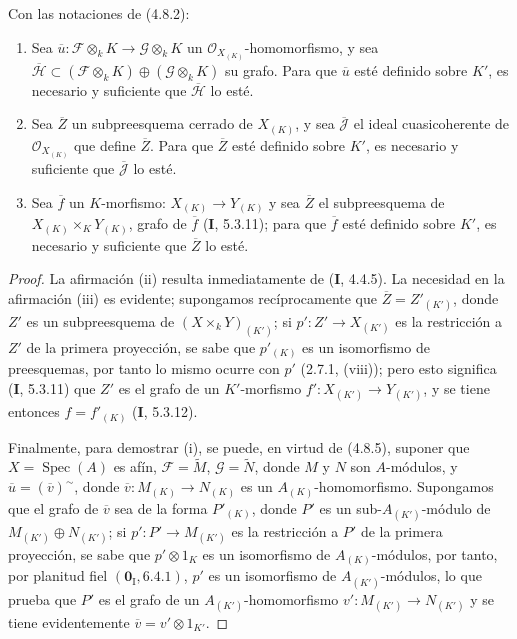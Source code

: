 \begin{lemma}[4.8.8]
\label{IV.2.4.8.8-fr}
Con las notaciones de \textup{(4.8.2)}:
\begin{enumerate}
\item[\textup{(i)}] Sea
$\overline u:\mathscr F\otimes_kK\to\mathscr G\otimes_kK$ un
$\mathcal O_{X_{(K)}}$-homomorfismo, y sea
$\overline{\mathscr H}\subset
(\mathscr F\otimes_kK)\oplus(\mathscr G\otimes_kK)$ su grafo. Para que
$\overline u$ esté definido sobre $K'$, es necesario y suficiente que
$\overline{\mathscr H}$ lo esté.
\item[\textup{(ii)}] Sea $\overline Z$ un subpreesquema cerrado de $X_{(K)}$, y sea
$\overline{\mathscr J}$ el ideal cuasicoherente de $\mathcal O_{X_{(K)}}$
que define $\overline Z$. Para que $\overline Z$ esté definido sobre $K'$, es
necesario y suficiente que $\overline{\mathscr J}$ lo esté.
\item[\textup{(iii)}] Sea $\overline f$ un $K$-morfismo:
$X_{(K)}\to Y_{(K)}$ y sea $\overline Z$ el subpreesquema de
$X_{(K)}\times_KY_{(K)}$, grafo de $\overline f$ \textup{(\textbf I, 5.3.11)}; para que
$\overline f$ esté definido sobre $K'$, es necesario y suficiente que $\overline Z$ lo
esté.
\end{enumerate}
\end{lemma}

\begin{proof}
La afirmación (ii) resulta inmediatamente de (\textbf I, 4.4.5). La necesidad en la
afirmación (iii) es evidente; supongamos recíprocamente que
$\overline Z=Z'_{(K')}$, donde $Z'$ es un subpreesquema de
$(X\times_kY)_{(K')}$; si $p':Z'\to X_{(K')}$ es la restricción a $Z'$ de la
primera proyección, se sabe que $p'_{(K)}$ es un isomorfismo de preesquemas,
por tanto lo mismo ocurre con $p'$ (2.7.1, (viii)); pero esto significa (\textbf I, 5.3.11)
que $Z'$ es el grafo de un $K'$-morfismo
$f':X_{(K')}\to Y_{(K')}$, y se tiene entonces
$f=f'_{(K)}$ (\textbf I, 5.3.12).

Finalmente, para demostrar (i), se puede, en virtud de (4.8.5), suponer que
$X=\operatorname{Spec}(A)$ es afín, $\mathscr F=\widetilde M$,
$\mathscr G=\widetilde N$, donde $M$ y $N$ son $A$-módulos, y
$\overline u=(\overline v)^{\sim}$, donde
$\overline v:M_{(K)}\to N_{(K)}$ es un $A_{(K)}$-homomorfismo. Supongamos
que el grafo de $\overline v$ sea de la forma $P'_{(K)}$, donde $P'$ es un
sub-$A_{(K')}$-módulo de $M_{(K')}\oplus N_{(K')}$; si
$p':P'\to M_{(K')}$ es la restricción a $P'$ de la primera proyección,
se sabe que $p'\otimes1_K$ es un isomorfismo de $A_{(K)}$-módulos, por tanto,
por planitud fiel $(\mathbf{0}_{\mathrm I},6.4.1)$, $p'$ es un isomorfismo de
$A_{(K')}$-módulos, lo que prueba que $P'$ es el grafo de un
$A_{(K')}$-homomorfismo $v':M_{(K')}\to N_{(K')}$ y se tiene evidentemente
$\overline v=v'\otimes1_{K'}$.
\end{proof}

